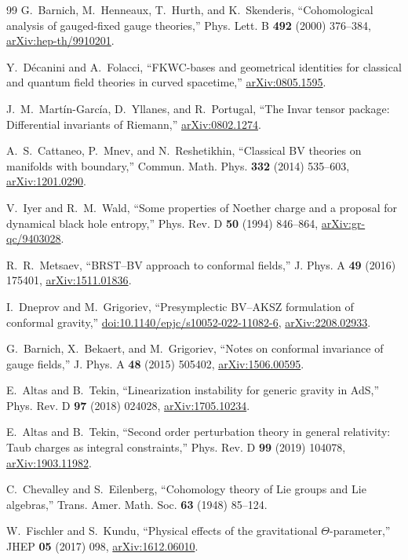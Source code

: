 \documentclass[11pt]{article}
\theoremstyle{definition}
\theoremstyle{remark}
\begin{document}
\begin{thebibliography}{99}
G.~Barnich, M.~Henneaux, T.~Hurth, and K.~Skenderis,
``Cohomological analysis of gauged-fixed gauge theories,''
Phys. Lett. B \textbf{492} (2000) 376--384,
\href{https://arxiv.org/abs/hep-th/9910201}{arXiv:hep-th/9910201}.

Y.~D\'ecanini and A.~Folacci,
``FKWC-bases and geometrical identities for classical and quantum field
theories in curved spacetime,''
\href{https://arxiv.org/abs/0805.1595}{arXiv:0805.1595}.

J.~M.~Mart\'in-Garc\'ia, D.~Yllanes, and R.~Portugal,
``The Invar tensor package: Differential invariants of Riemann,''
\href{https://arxiv.org/abs/0802.1274}{arXiv:0802.1274}.

A.~S.~Cattaneo, P.~Mnev, and N.~Reshetikhin,
``Classical BV theories on manifolds with boundary,''
Commun. Math. Phys. \textbf{332} (2014) 535--603,
\href{https://arxiv.org/abs/1201.0290}{arXiv:1201.0290}.

V.~Iyer and R.~M.~Wald,
``Some properties of Noether charge and a proposal for dynamical black hole
entropy,''
Phys. Rev. D \textbf{50} (1994) 846--864,
\href{https://arxiv.org/abs/gr-qc/9403028}{arXiv:gr-qc/9403028}.

R.~R.~Metsaev,
``BRST--BV approach to conformal fields,''
J. Phys. A \textbf{49} (2016) 175401,
\href{https://arxiv.org/abs/1511.01836}{arXiv:1511.01836}.

I.~Dneprov and M.~Grigoriev,
``Presymplectic BV--AKSZ formulation of conformal gravity,''
\href{https://doi.org/10.1140/epjc/s10052-022-11082-6}
{doi:10.1140/epjc/s10052-022-11082-6},
\href{https://arxiv.org/abs/2208.02933}{arXiv:2208.02933}.

G.~Barnich, X.~Bekaert, and M.~Grigoriev,
``Notes on conformal invariance of gauge fields,''
J. Phys. A \textbf{48} (2015) 505402,
\href{https://arxiv.org/abs/1506.00595}{arXiv:1506.00595}.

E.~Altas and B.~Tekin,
``Linearization instability for generic gravity in AdS,''
Phys. Rev. D \textbf{97} (2018) 024028,
\href{https://arxiv.org/abs/1705.10234}{arXiv:1705.10234}.

E.~Altas and B.~Tekin,
``Second order perturbation theory in general relativity: Taub charges as
integral constraints,''
Phys. Rev. D \textbf{99} (2019) 104078,
\href{https://arxiv.org/abs/1903.11982}{arXiv:1903.11982}.

C.~Chevalley and S.~Eilenberg,
``Cohomology theory of Lie groups and Lie algebras,''
Trans. Amer. Math. Soc. \textbf{63} (1948) 85--124.

W.~Fischler and S.~Kundu,
``Physical effects of the gravitational $\Theta$-parameter,''
JHEP \textbf{05} (2017) 098,
\href{https://arxiv.org/abs/1612.06010}{arXiv:1612.06010}.

\end{thebibliography}
\end{document}
